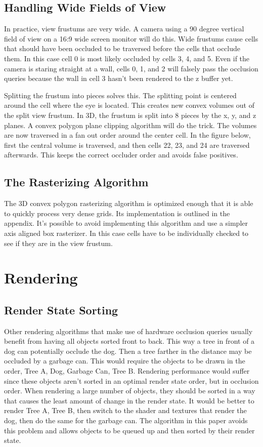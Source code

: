 \documentclass[12pt]{ucthesis}
\begin{document}
\subsection{Handling Wide Fields of View}
\label{handling-wide-fields-of-view}
In practice, view frustums are very wide.
A camera using a 90 degree vertical field of view on a 16:9 wide screen monitor will do this.
Wide frustums cause cells that should have been occluded to be traversed before the cells that occlude them.
In this case cell 0 is most likely occluded by cells 3, 4, and 5.
Even if the camera is staring straight at a wall, cells 0, 1, and 2 will falsely pass the occlusion queries because the wall in cell 3 hasn't been rendered to the z buffer yet.

Splitting the frustum into pieces solves this.
The splitting point is centered around the cell where the eye is located.
This creates new convex volumes out of the split view frustum.
In 3D, the frustum is split into 8 pieces by the x, y, and z planes.
A convex polygon plane clipping algorithm will do the trick.
The volumes are now traversed in a fan out order around the center cell.
In the figure below, first the central volume is traversed, and then cells 22, 23, and 24 are traversed afterwards.
This keeps the correct occluder order and avoids false positives.

\subsection{The Rasterizing Algorithm}
\label{the-rasterizing-algorithm}
The 3D convex polygon rasterizing algorithm is optimized enough that it is able to quickly process very dense grids.
Its implementation is outlined in the appendix.
It's possible to avoid implementing this algorithm and use a simpler axis aligned box rasterizer.
In this case cells have to be individually checked to see if they are in the view frustum.

\section{Rendering}
\label{rendering}

\subsection{Render State Sorting}
\label {render-state-sorting}
Other rendering algorithms that make use of hardware occlusion queries usually benefit from having all objects sorted front to back.
This way a tree in front of a dog can potentially occlude the dog.
Then a tree farther in the distance may be occluded by a garbage can.
This would require the objects to be drawn in the order, Tree A, Dog, Garbage Can, Tree B.
Rendering performance would suffer since these objects aren't sorted in an optimal render state order, but in occlusion order.
When rendering a large number of objects, they should be sorted in a way that causes the least amount of change in the render state.
It would be better to render Tree A, Tree B, then switch to the shader and textures that render the dog, then do the same for the garbage can.
The algorithm in this paper avoids this problem and allows objects to be queued up and then sorted by their render state.
\end{document}
